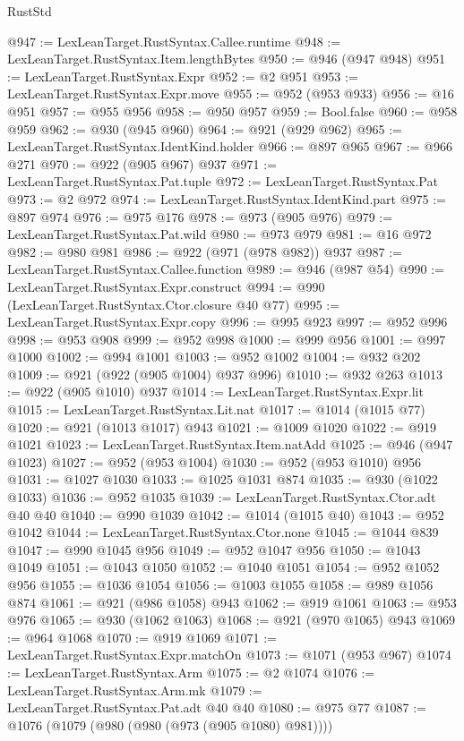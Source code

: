 \begin{lexlean}{RustStd}
\begin{coremodule}
@947 := LexLeanTarget.RustSyntax.Callee.runtime
@948 := LexLeanTarget.RustSyntax.Item.lengthBytes
@950 := @946 (@947 @948)
@951 := LexLeanTarget.RustSyntax.Expr
@952 := @2 @951
@953 := LexLeanTarget.RustSyntax.Expr.move
@955 := @952 (@953 @933)
@956 := @16 @951
@957 := @955 @956
@958 := @950 @957
@959 := Bool.false
@960 := @958 @959
@962 := @930 (@945 @960)
@964 := @921 (@929 @962)
@965 := LexLeanTarget.RustSyntax.IdentKind.holder
@966 := @897 @965
@967 := @966 @271
@970 := @922 (@905 @967) @937
@971 := LexLeanTarget.RustSyntax.Pat.tuple
@972 := LexLeanTarget.RustSyntax.Pat
@973 := @2 @972
@974 := LexLeanTarget.RustSyntax.IdentKind.part
@975 := @897 @974
@976 := @975 @176
@978 := @973 (@905 @976)
@979 := LexLeanTarget.RustSyntax.Pat.wild
@980 := @973 @979
@981 := @16 @972
@982 := @980 @981
@986 := @922 (@971 (@978 @982)) @937
@987 := LexLeanTarget.RustSyntax.Callee.function
@989 := @946 (@987 @54)
@990 := LexLeanTarget.RustSyntax.Expr.construct
@994 := @990 (LexLeanTarget.RustSyntax.Ctor.closure @40 @77)
@995 := LexLeanTarget.RustSyntax.Expr.copy
@996 := @995 @923
@997 := @952 @996
@998 := @953 @908
@999 := @952 @998
@1000 := @999 @956
@1001 := @997 @1000
@1002 := @994 @1001
@1003 := @952 @1002
@1004 := @932 @202
@1009 := @921 (@922 (@905 @1004) @937 @996)
@1010 := @932 @263
@1013 := @922 (@905 @1010) @937
@1014 := LexLeanTarget.RustSyntax.Expr.lit
@1015 := LexLeanTarget.RustSyntax.Lit.nat
@1017 := @1014 (@1015 @77)
@1020 := @921 (@1013 @1017) @943
@1021 := @1009 @1020
@1022 := @919 @1021
@1023 := LexLeanTarget.RustSyntax.Item.natAdd
@1025 := @946 (@947 @1023)
@1027 := @952 (@953 @1004)
@1030 := @952 (@953 @1010) @956
@1031 := @1027 @1030
@1033 := @1025 @1031 @874
@1035 := @930 (@1022 @1033)
@1036 := @952 @1035
@1039 := LexLeanTarget.RustSyntax.Ctor.adt @40 @40
@1040 := @990 @1039
@1042 := @1014 (@1015 @40)
@1043 := @952 @1042
@1044 := LexLeanTarget.RustSyntax.Ctor.none
@1045 := @1044 @839
@1047 := @990 @1045 @956
@1049 := @952 @1047 @956
@1050 := @1043 @1049
@1051 := @1043 @1050
@1052 := @1040 @1051
@1054 := @952 @1052 @956
@1055 := @1036 @1054
@1056 := @1003 @1055
@1058 := @989 @1056 @874
@1061 := @921 (@986 @1058) @943
@1062 := @919 @1061
@1063 := @953 @976
@1065 := @930 (@1062 @1063)
@1068 := @921 (@970 @1065) @943
@1069 := @964 @1068
@1070 := @919 @1069
@1071 := LexLeanTarget.RustSyntax.Expr.matchOn
@1073 := @1071 (@953 @967)
@1074 := LexLeanTarget.RustSyntax.Arm
@1075 := @2 @1074
@1076 := LexLeanTarget.RustSyntax.Arm.mk
@1079 := LexLeanTarget.RustSyntax.Pat.adt @40 @40
@1080 := @975 @77
@1087 := @1076 (@1079 (@980 (@980 (@973 (@905 @1080) @981))))

\end{coremodule}
\end{lexlean}
